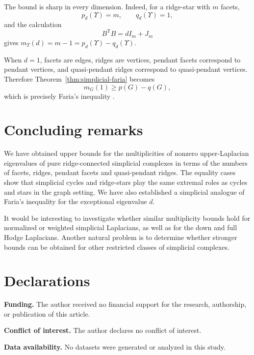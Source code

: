 \documentclass[12pt]{article}
\theoremstyle{remark}
\begin{document}
The bound is sharp in every dimension.  Indeed, for a ridge-star with $m$ facets,
\[
p_d(\Upsilon)=m,\qquad q_d(\Upsilon)=1,
\]
and the calculation
\[
B^{\mathsf T}B=dI_m+J_m
\]
gives $m_{\Upsilon}(d)=m-1=p_d(\Upsilon)-q_d(\Upsilon)$.

When $d=1$, facets are edges, ridges are vertices, pendant facets correspond to pendant vertices, and quasi-pendant ridges correspond to quasi-pendant vertices.  Therefore Theorem~\ref{thm:simplicial-faria} becomes
\[
m_G(1)\ge p(G)-q(G),
\]
which is precisely Faria's inequality \cite{Faria}.

\section{Concluding remarks}

We have obtained upper bounds for the multiplicities of nonzero upper-Laplacian eigenvalues of pure ridge-connected simplicial complexes in terms of the numbers of facets, ridges, pendant facets and quasi-pendant ridges.  The equality cases show that simplicial cycles and ridge-stars play the same extremal roles as cycles and stars in the graph setting.  We have also established a simplicial analogue of Faria's inequality for the exceptional eigenvalue $d$.

It would be interesting to investigate whether similar multiplicity bounds hold for normalized or weighted simplicial Laplacians, as well as for the down and full Hodge Laplacians.  Another natural problem is to determine whether stronger bounds can be obtained for other restricted classes of simplicial complexes.


\section*{Declarations}

\noindent
\textbf{Funding.} The author received no financial support for the research, authorship, or publication of this article.

\noindent
\textbf{Conflict of interest.} The author declares no conflict of interest.

\noindent
\textbf{Data availability.} No datasets were generated or analyzed in this study.
\end{document}
